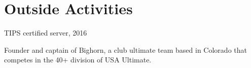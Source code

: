 \documentclass[letterpaper]{resume}
\begin{document}
\section{Outside Activities}

\vspace{0.5em}
\begin{compactitem}[\itembullet]
  \item TIPS certified server, 2016
  \item Founder and captain of Bighorn, a club ultimate team based in
    Colorado that competes in the 40+ division of USA Ultimate.
\end{compactitem}
\end{document}
